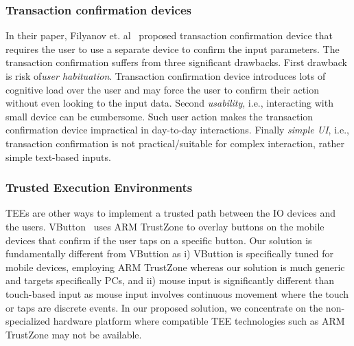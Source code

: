 \subsubsection{Transaction confirmation devices} In their paper, Filyanov et. al~\cite{filyanov2011uni} proposed transaction confirmation device that requires the user to use a separate device to confirm the input parameters. The transaction confirmation suffers from three significant drawbacks. First drawback is risk of\emph{user habituation}. Transaction confirmation device introduces lots of cognitive load over the user and may force the user to confirm their action without even looking to the input data. Second \emph{usability}, i.e., interacting with small device can be cumbersome. Such user action makes the transaction confirmation device impractical in day-to-day interactions. Finally \emph{simple UI}, i.e., transaction confirmation is not practical/suitable for complex interaction, rather simple text-based inputs. 



\subsubsection{Trusted Execution Environments} TEEs are other ways to implement a trusted path between the IO devices and the users. %
VButton~\cite{li2018vbutton} uses ARM TrustZone to overlay buttons on the mobile devices that confirm if the user taps on a specific button. Our solution is fundamentally different from VButtion as i) VButtion is specifically tuned for mobile devices, employing ARM TrustZone whereas our solution is much generic and targets specifically PCs, and ii) mouse input is significantly different than touch-based input as mouse input involves continuous movement where the touch or taps are discrete events. In our proposed solution, we concentrate on the non-specialized hardware platform where compatible TEE technologies such as ARM TrustZone may not be available. 

